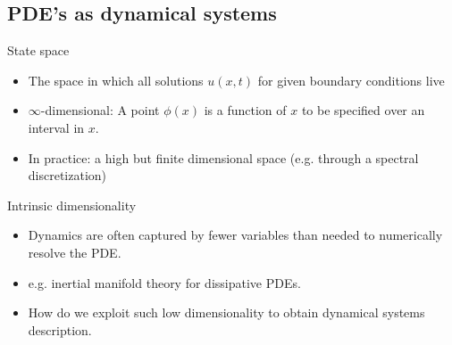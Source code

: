 \documentclass{beamer}
\begin{document}
\subsection{PDE's as dynamical systems}

\begin{frame}

\begin{block}{State space}
 \begin{itemize}
	\item The space in which all solutions $u(x,t)$ for given boundary conditions live
	\item $\infty$-dimensional: A point $\phi(x)$ is a function of $x$ to be specified
		over an interval in $x$.
	\item In practice: a high but finite dimensional space (e.g. through a spectral discretization)
 \end{itemize}
\end{block}

\begin{block}{Intrinsic dimensionality}
 \begin{itemize}
  \item Dynamics are often captured by fewer variables than needed to numerically resolve the PDE.
  \item e.g. inertial manifold theory for dissipative PDEs.
  \item How do we exploit such low dimensionality to obtain dynamical systems description.
 \end{itemize}
\end{block}

\end{frame}
\end{document}
